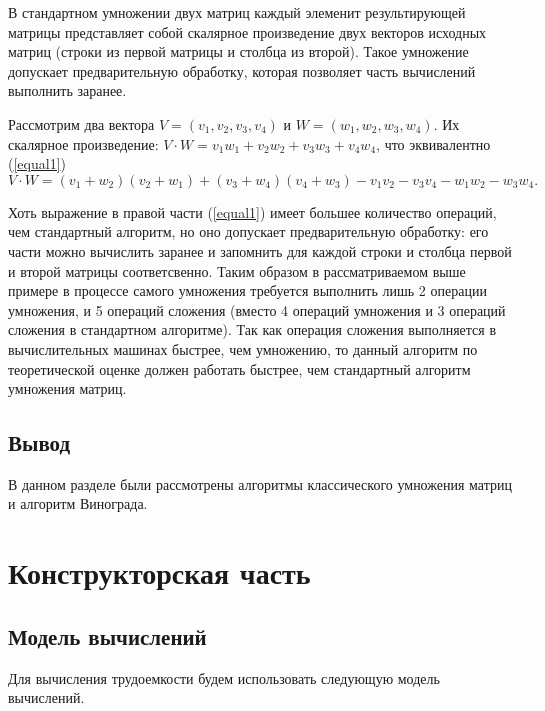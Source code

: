 \documentclass[12pt]{report}
\begin{document}
	В стандартном умножении двух матриц каждый элеменит результирующей матрицы представляет собой скалярное произведение двух векторов исходных матриц (строки из первой матрицы и столбца из второй). Такое умножение допускает предварительную обработку, которая позволяет часть вычислений выполнить заранее.
	
	Рассмотрим два вектора $V = (v_1, v_2, v_3, v_4)$ и $W = (w_1, w_2, w_3, w_4)$.
Их скалярное произведение: $V \cdot W = v_1w_1 + v_2w_2 + v_3w_3 + v_4w_4$, что эквивалентно (\ref{equal1})
\begin{equation}
	\label{equal1}
		V \cdot W = (v_1 + w_2)(v_2 + w_1) + (v_3 + w_4)(v_4 + w_3) - v_1v_2 - v_3v_4 - w_1w_2 - w_3w_4.
\end{equation}

	Хоть выражение в правой части (\ref{equal1}) имеет большее количество операций, чем стандартный алгоритм, но оно допускает предварительную обработку: его части можно вычислить заранее и запомнить для каждой строки и столбца первой и второй матрицы соответсвенно. Таким образом в рассматриваемом выше примере в процессе самого умножения требуется выполнить лишь 2 операции умножения, и 5 операций сложения (вместо 4 операций умножения и 3 операций сложения в стандартном алгоритме). Так как операция сложения выполняется в вычислительных машинах быстрее, чем умножению, то данный алгоритм по теоретической оценке должен работать быстрее, чем стандартный алгоритм умножения матриц. 
	
	\section*{Вывод}
	
	В данном разделе были рассмотрены алгоритмы классического умножения матриц и алгоритм Винограда.
	
	\chapter{Конструкторская часть}
	
	\section{Модель вычислений}

	Для вычисления трудоемкости будем использовать следующую модель вычислений.
\end{document}
